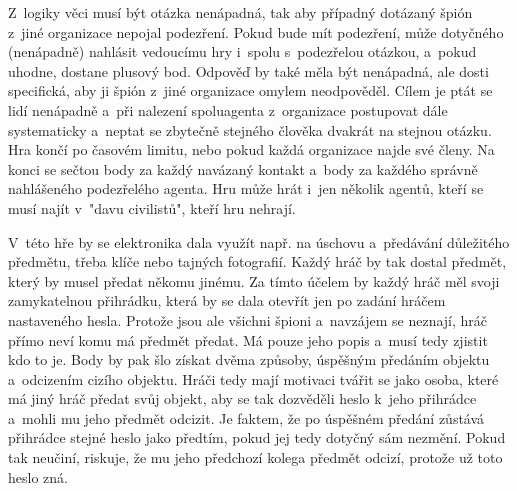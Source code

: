 Z~logiky věci musí být otázka nenápadná, tak aby případný dotázaný špión z~jiné organizace nepojal podezření. 
Pokud bude mít podezření, může dotyčného (nenápadně) nahlásit vedoucímu hry i~spolu s~podezřelou otázkou, a~pokud uhodne, dostane plusový bod.
Odpověď by také měla být nenápadná, ale dosti specifická, aby ji špión z~jiné organizace omylem neodpověděl.
Cílem je ptát se lidí nenápadně a~při nalezení spoluagenta z~organizace postupovat dále systematicky a~neptat se zbytečně stejného člověka dvakrát na stejnou otázku.
Hra končí po časovém limitu, nebo pokud každá organizace najde své členy. 
Na konci se sečtou body za každý navázaný kontakt a~body za každého správně nahlášeného podezřelého agenta.
Hru může hrát i~jen několik agentů, kteří se musí najít v~"davu civilistů", kteří hru nehrají.

V~této hře by se elektronika dala využít např. na úschovu a~předávání důležitého předmětu, třeba klíče nebo tajných fotografií.
Každý hráč by tak dostal předmět, který by musel předat někomu jinému.
Za tímto účelem by každý hráč měl svoji zamykatelnou přihrádku, která by se dala otevřít jen po zadání hráčem nastaveného hesla.
Protože jsou ale všichni špioni a~navzájem se neznají, hráč přímo neví komu má předmět předat.
Má pouze jeho popis a~musí tedy zjistit kdo to je.
Body by pak šlo získat dvěma způsoby, úspěšným předáním objektu a~odcizením cizího objektu.
Hráči tedy mají motivaci tvářit se jako osoba, které má jiný hráč předat svůj objekt, aby se tak dozvěděli heslo k~jeho přihrádce a~mohli mu jeho předmět odcizit.
Je faktem, že po úspěšném předání zůstává přihrádce stejné heslo jako předtím, pokud jej tedy dotyčný sám nezmění.
Pokud tak neučiní, riskuje, že mu jeho předchozí kolega předmět odcizí, protože už toto heslo zná.


